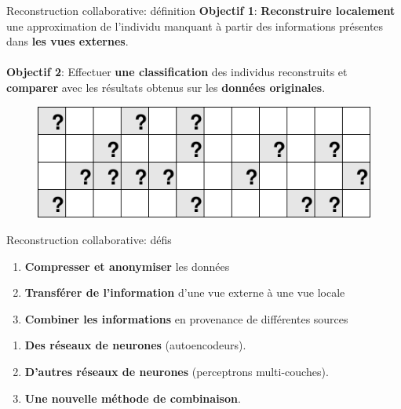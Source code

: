 \documentclass[hyperref={pdfpagelabels=false}]{beamer}
\begin{document}
    \begin{frame}{Reconstruction collaborative: définition}
        \textbf{Objectif 1}: \textbf{Reconstruire localement} une approximation 
        de l'individu manquant à partir des informations présentes dans 
        \textbf{les vues externes}.\\~\\
        \textbf{Objectif 2}: Effectuer \textbf{une classification} des individus 
        reconstruits et \textbf{comparer} avec les résultats obtenus sur les 
        \textbf{données originales}.
        \vspace{0.5cm}
        \begin{figure}[h]
            \centering
            \includegraphics[scale=.15]{missing}
        \end{figure}
    \end{frame}

    \begin{frame}{Reconstruction collaborative: défis}
        \begin{enumerate}
            \item \textbf{Compresser et anonymiser} les données
            \item \textbf{Transférer de l'information} d'une vue externe à une 
                vue locale
            \item \textbf{Combiner les informations} en provenance de 
                différentes sources
        \end{enumerate}

        \begin{enumerate}[<+(1)->]
            \item \textbf{Des réseaux de neurones} (autoencodeurs).
            \item \textbf{D'autres réseaux de neurones} (perceptrons 
                multi-couches).
            \item \textbf{Une nouvelle méthode de combinaison}.
        \end{enumerate}
    \end{frame}
\end{document}

